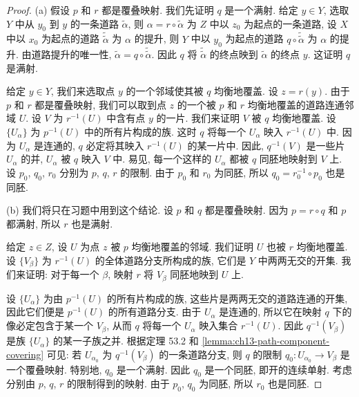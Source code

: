 \begin{proof}
(a) 假设 $p$ 和 $r$ 都是覆叠映射. 我们先证明 $q$ 是一个满射. 给定 $y\in Y$, 选取 $Y$ 中从 $y_{0}$ 到 $y$ 的一条道路 $\widetilde{\alpha}$, 则 $\alpha=r\circ\widetilde{\alpha}$ 为 $Z$ 中以 $z_{0}$ 为起点的一条道路, 设 $X$ 中以 $x_{0}$ 为起点的道路 $\widetilde{\widetilde{\alpha}}$ 为 $\alpha$ 的提升, 则 $Y$ 中以 $y_{0}$ 为起点的道路 $q\circ\widetilde{\widetilde{\alpha}}$ 为 $\alpha$ 的提升. 由道路提升的唯一性, $\widetilde{\alpha}=q\circ\widetilde{\widetilde{\alpha}}$. 因此 $q$ 将 $\widetilde{\widetilde{\alpha}}$ 的终点映到 $\widetilde{\alpha}$ 的终点 $y$. 这证明 $q$ 是满射.

给定 $y\in Y$, 我们来选取点 $y$ 的一个邻域使其被 $q$ 均衡地覆盖. 设 $z=r(y)$. 由于 $p$ 和 $r$ 都是覆叠映射, 我们可以取到点 $z$ 的一个被 $p$ 和 $r$ 均衡地覆盖的道路连通邻域 $U$. 设 $V$ 为 $r^{-1}(U)$ 中含有点 $y$ 的一片. 我们来证明 $V$ 被 $q$ 均衡地覆盖. 设 $\{U_{\alpha}\}$ 为 $p^{-1}(U)$ 中的所有片构成的族. 这时 $q$ 将每一个 $U_{\alpha}$ 映入 $r^{-1}(U)$ 中. 因为 $U_{\alpha}$ 是连通的, $q$ 必定将其映入 $r^{-1}(U)$ 的某一片中. 因此, $q^{-1}(V)$ 是一些片 $U_{\alpha}$ 的并, $U_{\alpha}$ 被 $q$ 映入 $V$ 中. 易见, 每一个这样的 $U_{\alpha}$ 都被 $q$ 同胚地映射到 $V$ 上. 设 $p_{0}$, $q_{0}$, $r_{0}$ 分别为 $p$, $q$, $r$ 的限制. 由于 $p_{0}$ 和 $r_{0}$ 为同胚, 所以 $q_{0}=r_{0}^{-1}\circ p_{0}$ 也是同胚.

(b) 我们将只在习题中用到这个结论. 设 $p$ 和 $q$ 都是覆叠映射. 因为 $p=r\circ q$ 和 $p$ 都满射, 所以 $r$ 也是满射.

给定 $z\in Z$, 设 $U$ 为点 $z$ 被 $p$ 均衡地覆盖的邻域. 我们证明 $U$ 也被 $r$ 均衡地覆盖. 设 $\{V_{\beta}\}$ 为 $r^{-1}(U)$ 的全体道路分支所构成的族, 它们是 $Y$ 中两两无交的开集. 我们来证明: 对于每一个 $\beta$, 映射 $r$ 将 $V_{\beta}$ 同胚地映到 $U$ 上.

设 $\{U_{\alpha}\}$ 为由 $p^{-1}(U)$ 的所有片构成的族, 这些片是两两无交的道路连通的开集, 因此它们便是 $p^{-1}(U)$ 的所有道路分支. 由于 $U_{\alpha}$ 是连通的, 所以它在映射 $q$ 下的像必定包含于某一个 $V_{\beta}$, 从而 $q$ 将每一个 $U_{\alpha}$ 映入集合 $r^{-1}(U)$. 因此 $q^{-1}(V_{\beta})$ 是族 $\{U_{\alpha}\}$ 的某一子族之并. 根据定理 53.2 和 \cref{lemma:ch13-path-component-covering} 可见: 若 $U_{\alpha_{0}}$ 为 $q^{-1}(V_{\beta})$ 的一条道路分支, 则 $q$ 的限制 $q_{0}\colon U_{\alpha_{0}}\to V_{\beta}$ 是一个覆叠映射. 特别地, $q_{0}$ 是一个满射. 因此 $q_{0}$ 是一个同胚, 即开的连续单射. 考虑分别由 $p$, $q$, $r$ 的限制得到的映射. 由于 $p_{0}$, $q_{0}$ 为同胚, 所以 $r_{0}$ 也是同胚.
\end{proof}

